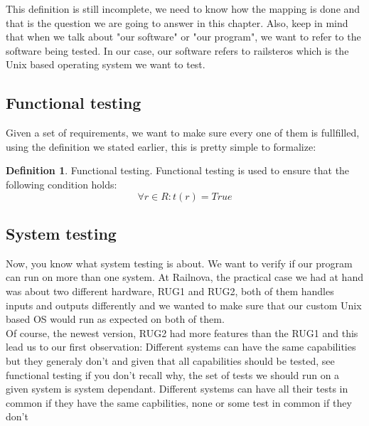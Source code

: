 \documentclass[12pt]{article}
\theoremstyle{definition}
\newtheorem{definition}{Definition}[section]
\theoremstyle{definition}
\theoremstyle{remark}
\begin{document}
This definition is still incomplete, we need to know how the mapping is done and that is the question we are going to answer in this chapter. Also, keep in mind that when we talk about "our software" or "our program", we want to refer to the software being tested. In our case, our software refers to \gls{railsteros} which is the Unix based operating system we want to test.



\subsection{Functional testing}


Given a set of requirements, we want to make sure every one of them is fullfilled, using the definition we stated earlier, this is pretty simple to formalize:

\theoremstyle{definition}
\begin{definition}{Functional testing.} Functional testing is used to ensure that the following condition holds:
$$\forall r \in R: t(r) = True$$
\end{definition}



\subsection{System testing}


Now, you know what system testing is about. We want to verify if our program can run on more than one system. At Railnova, the practical case we had at hand was about two different hardware, RUG1 and RUG2, both of them handles inputs and outputs differently and we wanted to make sure that our custom Unix based OS would run as expected on both of them.\\

Of course, the newest version, RUG2 had more features than the RUG1 and this lead us to our first observation: Different systems can have the same capabilities but they generaly don't and given that all capabilities should be tested, see functional testing if you don't recall why, the set of tests we should run on a given system is system dependant. Different systems can have all their tests in common if they have the same capbilities, none or some test in common if they don't\\
\end{document}
